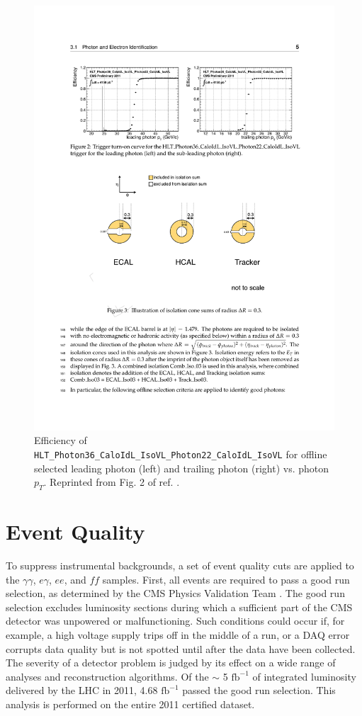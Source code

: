 \documentclass[dissertation.tex]{subfiles}
\begin{document}
\begin{figure}
	\centering
	\includegraphics[scale=0.95]{HLT_efficiency}
	\caption{Efficiency of \texttt{HLT\_Photon36\_CaloIdL\_IsoVL\_Photon22\_CaloIdL\_IsoVL} for offline selected leading photon (left) and trailing photon (right) vs. photon $p_{T}$.  Reprinted from Fig. 2 of ref. \cite{CMS_AN-2011-515}.}
	\label{fig:HLT_efficiency}
\end{figure}

\section{Event Quality}
\label{sec:Event Quality}

To suppress instrumental backgrounds, a set of event quality cuts are applied to the $\gamma\gamma$, $e\gamma$, $ee$, and $\mathit{ff}$ samples.  First, all events are required to pass a good run selection, as determined by the CMS Physics Validation Team \cite{CMS_PVT}.  The good run selection excludes luminosity sections during which a sufficient part of the CMS detector was unpowered or malfunctioning.  Such conditions could occur if, for example, a high voltage supply trips off in the middle of a run, or a DAQ error corrupts data quality but is not spotted until after the data have been collected.  The severity of a detector problem is judged by its effect on a wide range of analyses and reconstruction algorithms.  Of the $\sim$ 5 $\mbox{fb}^{-1}$ of integrated luminosity delivered by the LHC in 2011, 4.68 $\mbox{fb}^{-1}$ passed the good run selection.  This analysis is performed on the entire 2011 certified dataset.
\end{document}
